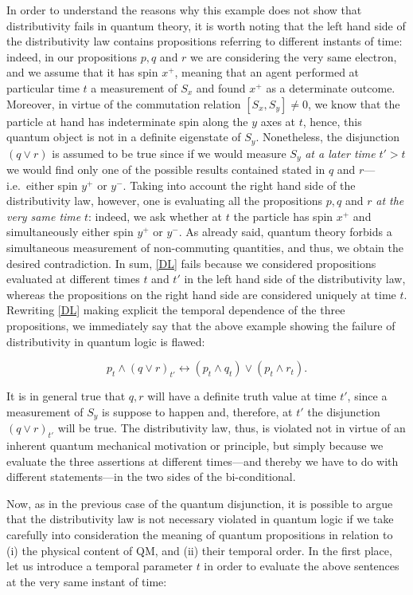 \documentclass[11pt, executivepaper]{article}
\begin{document}
In order to understand the reasons why this example does not show that distributivity fails in quantum theory, it is worth noting that the left hand side of the distributivity law contains propositions referring to different instants of time: indeed, in our propositions $p, q$ and $r$ we are considering the very same electron, and we assume that it has spin $x^+$, meaning that an agent performed at particular time $t$ a measurement of $S_x$ and found $x^+$ as a determinate outcome. Moreover, in virtue of the commutation relation $[S_x, S_y]\neq0$, we know that the particle at hand has indeterminate spin along the $y$ axes at $t$, hence, this quantum object is not in a definite eigenstate of $S_y$. Nonetheless, the disjunction $(q \vee r)$ is assumed to be true since if we would measure $S_y$ \emph{at a later time} $t'>t$ we would find only one of the possible results contained stated in $q$ and $r$---i.e.\ either spin $y^+$ or $y^-$. Taking into account the right hand side of the distributivity law, however, one is evaluating all the propositions $p, q$ and $r$ \emph{at the very same time} $t$: indeed, we ask whether at $t$ the particle has spin $x^+$ and simultaneously either spin $y^+$ or $y^-$. As already said, quantum theory forbids a simultaneous measurement of non-commuting quantities, and thus, we obtain the desired contradiction. 
In sum, \eqref{DL} fails because we considered propositions evaluated at different times $t$ and $t'$ in the left hand side of the distributivity law, whereas the propositions on the right hand side are considered uniquely at time $t$. Rewriting \eqref{DL} making explicit the temporal dependence of the three propositions, we immediately say that the above example showing the failure of distributivity in quantum logic is flawed: 

$$p_t \wedge (q \vee r)_{t'} \longleftrightarrow (p_t \wedge q_t) \vee (p_t\wedge r_t).$$

\noindent It is in general true that $q, r$ will have a definite truth value at time $t'$, since a measurement of $S_y$ is suppose to happen and, therefore, at $t'$ the disjunction $(q \vee r)_{t'}$ will be true. The distributivity law, thus, is violated not in virtue of an inherent quantum mechanical motivation or principle, but simply because we evaluate the three assertions at different times---and thereby we have to do with different statements---in the two sides of the bi-conditional. 

Now, as in the previous case of the quantum disjunction, it is possible to argue that the distributivity law is not necessary violated in quantum logic if we take carefully into consideration the meaning of quantum propositions in relation to (i) the physical content of QM, and (ii) their temporal order. In the first place, let us introduce a temporal parameter $t$ in order to evaluate the above sentences at the very same instant of time:
\end{document}
